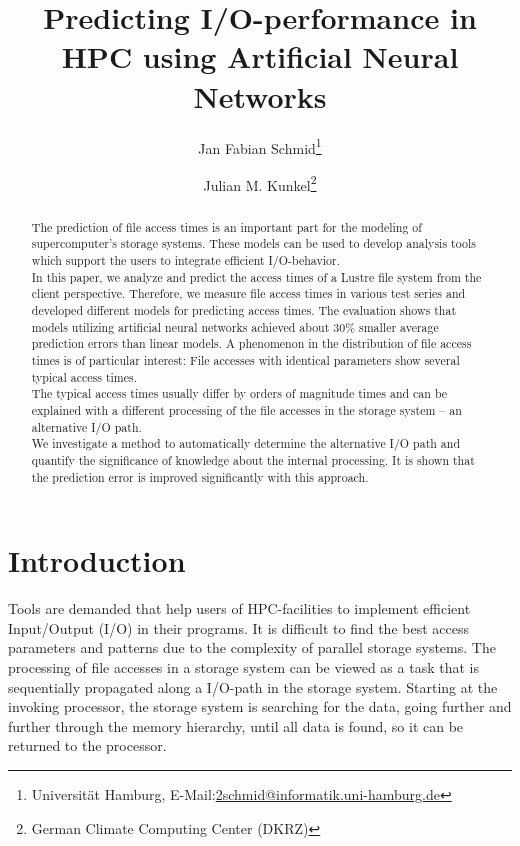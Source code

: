 \documentclass{superfri}
\begin{document}
\author{Jan Fabian Schmid\footnote{\label{susu}Universität Hamburg, E-Mail:\url{2schmid@informatik.uni-hamburg.de}} \and Julian M. Kunkel\footnote{German Climate Computing Center (DKRZ)}}

\title{Predicting I/O-performance in HPC using Artificial Neural Networks}

\maketitle{}

\begin{abstract} %
	
The prediction of file access times is an important part for the modeling of supercomputer's storage systems. 
These models can be used to develop analysis tools which support the users to integrate efficient I/O-behavior.\\
In this paper, we analyze and predict the access times of a Lustre file system from the client perspective.
Therefore, we measure file access times in various test series and developed different models for predicting access times. 
The evaluation shows that models utilizing artificial neural networks achieved about 30\% smaller average prediction errors than linear models. 
A phenomenon in the distribution of file access times is of particular interest:
File accesses with identical parameters show several typical access times.\\
The typical access times usually differ by orders of magnitude times and can be explained with a different processing of the file accesses in the storage system -- an alternative I/O path.\\
We investigate a method to automatically determine the alternative I/O path and quantify the significance of knowledge about the internal processing.
It is shown that the prediction error is improved significantly with this approach.

\end{abstract}

\section*{Introduction} %
\label{sec:intro}

Tools are demanded that help users of HPC-facilities to implement efficient Input/Output (I/O) in their programs.
It is difficult to find the best access parameters and patterns due to the complexity of parallel storage systems.
The processing of file accesses in a storage system can be viewed as a task that is sequentially propagated along a I/O-path in the storage system.
Starting at the invoking processor, the storage system is searching for the data, going further and further through the memory hierarchy, until all data is found, so it can be returned to the processor.
\end{document}
